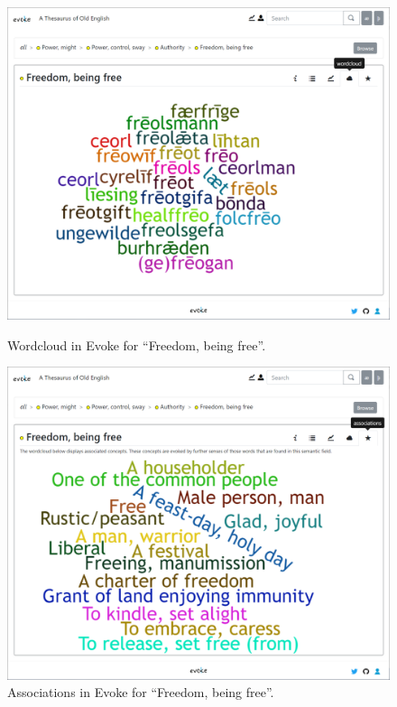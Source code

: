 \begin{figure}[h]
\centering
\begin{minipage}{.48\textwidth}
  \includegraphics[width=\textwidth]{Stolk2021x/fig/Stolk-wordcloud.png}
	\caption[]{\label{fig:Stolk2021x:Evoke-wc}Wordcloud in Evoke for ``Freedom, being free''.}
\end{minipage}
\begin{minipage}{.04\textwidth}\end{minipage}
\begin{minipage}{.48\textwidth}
  \includegraphics[width=\textwidth]{Stolk2021x/fig/Stolk-associations.png}
	\caption[]{\label{fig:Stolk2021x:Evoke-assoc}Associations in Evoke for ``Freedom, being free''.}
\end{minipage}
\end{figure}


